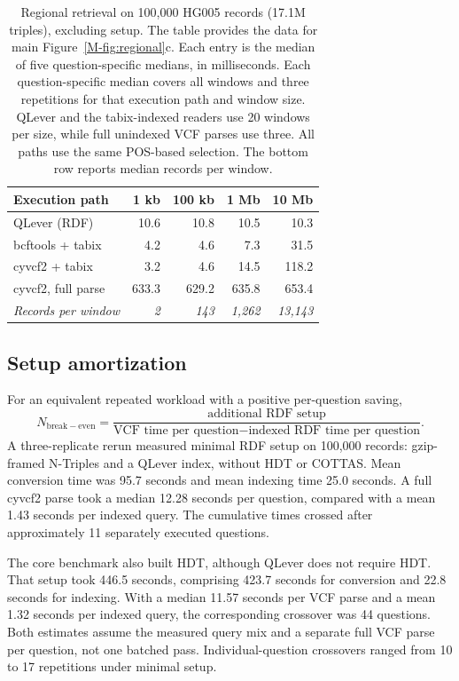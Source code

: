 \documentclass[11pt]{article}
\begin{document}
\begin{table}[!htbp]
\caption{Regional retrieval on 100,000 HG005 records (17.1M triples), excluding setup.
The table provides the data for main Figure~\ref{M-fig:regional}c.
Each entry is the median of five question-specific medians, in milliseconds.
Each question-specific median covers all windows and three repetitions for that execution path and window size.
QLever and the tabix-indexed readers use 20 windows per size, while full unindexed VCF parses use three.
All paths use the same POS-based selection.
The bottom row reports median records per window.}\label{tab:regional}%
\centering\footnotesize\setlength{\tabcolsep}{7pt}\renewcommand{\arraystretch}{1.1}%
\begin{tabular}{@{}l r r r r@{}}
\toprule
\textbf{Execution path} & \textbf{1 kb} & \textbf{100 kb} & \textbf{1 Mb} & \textbf{10 Mb}\\
\midrule
QLever (RDF) & 10.6 & 10.8 & 10.5 & 10.3\\
bcftools + tabix & 4.2 & 4.6 & 7.3 & 31.5\\
cyvcf2 + tabix & 3.2 & 4.6 & 14.5 & 118.2\\
cyvcf2, full parse & 633.3 & 629.2 & 635.8 & 653.4\\
\addlinespace[3pt]
\textit{Records per window} & \textit{2} & \textit{143} & \textit{1{,}262} & \textit{13{,}143}\\
\bottomrule
\end{tabular}
\end{table}

\subsection{Setup amortization}\label{subsec:measurements-setup}
For an equivalent repeated workload with a positive per-question saving,
\begin{equation}
N_{\mathrm{break-even}}=\frac{\text{additional RDF setup}}{\text{VCF time per question}-\text{indexed RDF time per question}}.
\end{equation}
A three-replicate rerun measured minimal RDF setup on 100,000 records: gzip-framed N-Triples and a QLever index, without HDT or COTTAS.
Mean conversion time was 95.7 seconds and mean indexing time 25.0 seconds.
A full cyvcf2 parse took a median 12.28 seconds per question, compared with a mean 1.43 seconds per indexed query.
The cumulative times crossed after approximately 11 separately executed questions.

The core benchmark also built HDT, although QLever does not require HDT.
That setup took 446.5 seconds, comprising 423.7 seconds for conversion and 22.8 seconds for indexing.
With a median 11.57 seconds per VCF parse and a mean 1.32 seconds per indexed query, the corresponding crossover was 44 questions.
Both estimates assume the measured query mix and a separate full VCF parse per question, not one batched pass.
Individual-question crossovers ranged from 10 to 17 repetitions under minimal setup.
\end{document}
